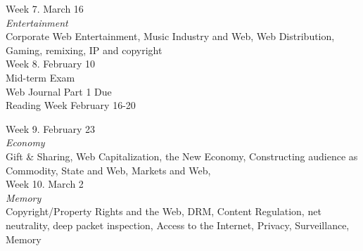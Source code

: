 \documentclass[10pt]{article}
\begin{document}

Week 7. March 16 \\
\textit{Entertainment} \\
Corporate Web Entertainment, Music Industry and Web, Web Distribution, Gaming, remixing, IP and copyright \\

Week 8. February 10 \\
Mid-term Exam \\
Web Journal Part 1 Due \\

Reading Week February 16-20

Week 9. February 23 \\
\textit{Economy} \\
Gift \& Sharing, Web Capitalization, the New Economy, Constructing audience as Commodity, State and Web, Markets and Web, \\

Week 10. March 2 \\
\textit{Memory} \\
Copyright/Property Rights and the Web, DRM, Content Regulation, net neutrality, deep packet inspection, Access to the Internet, Privacy, Surveillance, Memory \\
\end{document}
